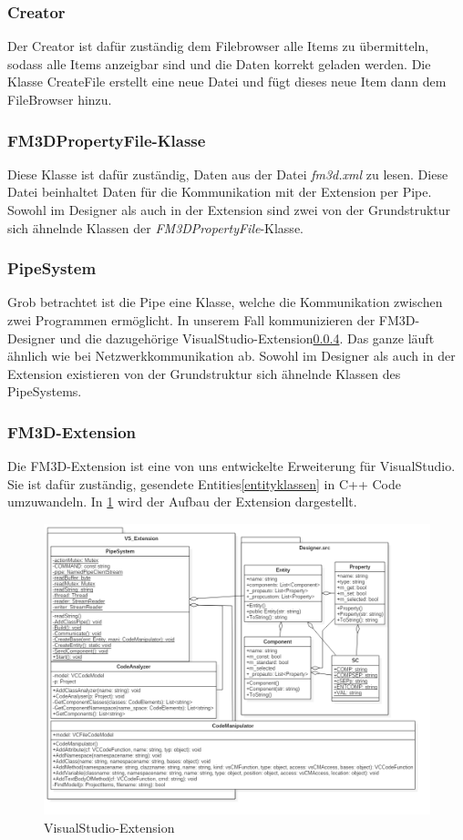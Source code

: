 \subsubsection{Creator}
Der Creator ist dafür zuständig dem Filebrowser alle Items zu übermitteln, sodass alle Items anzeigbar sind und die Daten korrekt geladen werden. Die Klasse CreateFile erstellt eine neue Datei und fügt dieses neue Item dann dem FileBrowser hinzu.

\subsubsection{FM3DPropertyFile-Klasse}
Diese Klasse ist dafür zuständig, Daten aus der Datei \textit{fm3d.xml} zu lesen. Diese Datei beinhaltet Daten für die Kommunikation mit der Extension per Pipe. Sowohl im Designer als auch in der Extension sind zwei von der Grundstruktur sich ähnelnde Klassen der \textit{FM3DPropertyFile}-Klasse.

\subsubsection{PipeSystem} 
\label{pipe}
Grob betrachtet ist die Pipe eine Klasse, welche die Kommunikation zwischen zwei Programmen ermöglicht. In unserem Fall kommunizieren der FM3D-Designer und die dazugehörige VisualStudio-Extension\ref{extension}. Das ganze läuft ähnlich wie bei Netzwerkkommunikation ab. 
Sowohl im Designer als auch in der Extension existieren von der Grundstruktur sich ähnelnde Klassen des PipeSystems.

\subsubsection{FM3D-Extension}
\label{extension}
Die FM3D-Extension ist eine von uns entwickelte Erweiterung für VisualStudio. Sie ist dafür zuständig, gesendete Entities\ref{entityklassen} in C++ Code umzuwandeln. In \cref{vsextensiondia} wird der Aufbau der Extension dargestellt.
\begin{figure}
	\begin{center}
		\includegraphics[width=\textwidth]{03unserprogramm/Designer/VSExtension.png}
		\caption{VisualStudio-Extension}\label{vsextensiondia}
	\end{center}
\end{figure}
